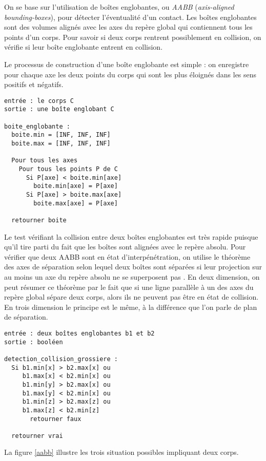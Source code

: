 On se base sur l'utilisation de boîtes englobantes, ou \textit{AABB}
(\textit{axis-aligned bounding-boxes}), pour détecter l'éventualité
d'un contact. Les boîtes englobantes sont des volumes alignés avec les
axes du repère global qui contiennent tous les points d'un corps. Pour
savoir si deux corps rentrent possiblement en collision, on vérifie si
leur boîte englobante entrent en collision.

Le processus de construction d'une boîte englobante est simple : on
enregistre pour chaque axe les deux points du corps qui sont les plus
éloignés dans les sens positifs et négatifs.

\begin{verbatim}
entrée : le corps C
sortie : une boîte englobant C

boite_englobante :
  boite.min = [INF, INF, INF]
  boite.max = [INF, INF, INF]

  Pour tous les axes
    Pour tous les points P de C
      Si P[axe] < boite.min[axe]
        boite.min[axe] = P[axe]
      Si P[axe] > boite.max[axe]
        boite.max[axe] = P[axe]

  retourner boite
\end{verbatim}

Le test vérifiant la collision entre deux boîtes englobantes est très
rapide puisque qu'il tire parti du fait que les boîtes sont alignées
avec le repère absolu. Pour vérifier que deux AABB sont en état
d'interpénétration, on utilise le théorème des axes de séparation
selon lequel deux boîtes sont séparées si leur projection sur au moins
un axe du repère absolu ne se superposent pas \cite{ericson05}. En
deux dimension, on peut résumer ce théorème par le fait que si une
ligne parallèle à un des axes du repère global sépare deux corps,
alors ils ne peuvent pas être en état de collision. En trois dimension
le principe est le même, à la différence que l'on parle de plan de
séparation.

\begin{verbatim}
entrée : deux boîtes englobantes b1 et b2
sortie : booléen

detection_collision_grossiere :
  Si b1.min[x] > b2.max[x] ou
     b1.max[x] < b2.min[x] ou
     b1.min[y] > b2.max[x] ou
     b1.max[y] < b2.min[x] ou
     b1.min[z] > b2.max[z] ou
     b1.max[z] < b2.min[z]
       retourner faux

  retourner vrai
\end{verbatim}

La figure \ref{aabb} illustre les trois situation possibles impliquant
deux corps.

